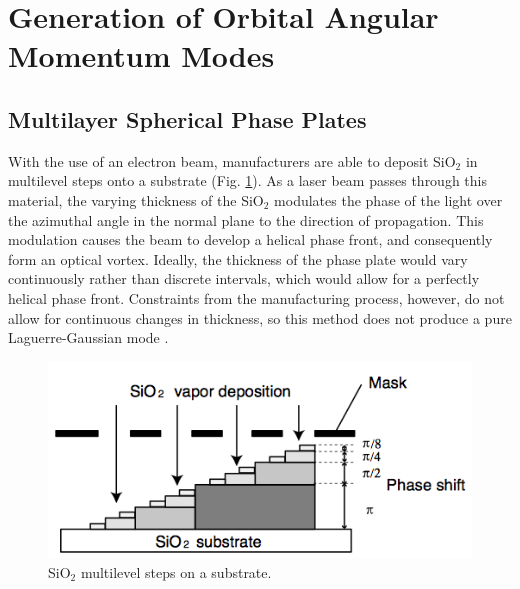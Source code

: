 \documentclass[10pt]{article}
\begin{document}
\section*{Generation of Orbital Angular Momentum Modes}
\subsection*{Multilayer Spherical Phase Plates}
With the use of an electron beam, manufacturers are able to deposit SiO$_2$ in multilevel steps onto a substrate (Fig. \ref{mspp}). As a laser beam passes through this material, the varying thickness of the SiO$_2$ modulates the phase of the light over the azimuthal angle in the normal plane to the direction of propagation. This modulation causes the beam to develop a helical phase front, and consequently  form an optical vortex. Ideally, the thickness of the phase plate would vary continuously rather than discrete intervals, which would allow for a perfectly helical phase front. Constraints from the manufacturing process, however, do not allow for continuous changes in thickness, so this method does not produce a pure Laguerre-Gaussian mode \cite{MSPP}.

\begin{figure}[h]
\centering
\includegraphics[scale=.5]{MSPP}
\caption{SiO$_2$ multilevel steps on a substrate.}
\label{mspp}
\end{figure}
\end{document}

